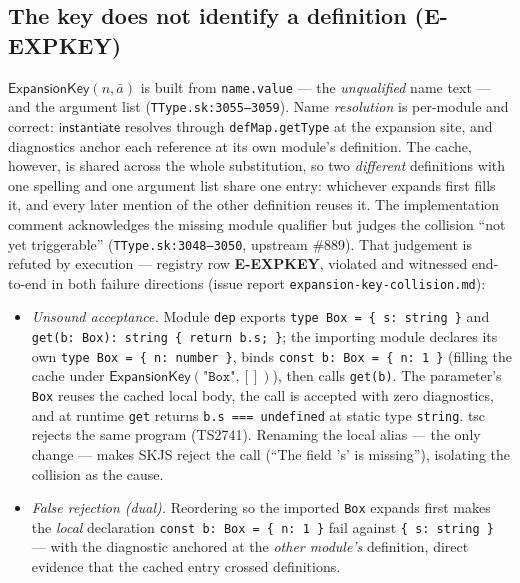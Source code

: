 \documentclass[11pt]{article}
\newcommand{\instop}{\mathsf{instantiate}}
\begin{document}
\subsection{The key does not identify a definition (E-EXPKEY)}
\label{sec:expkey}

$\mathsf{ExpansionKey}(n,\bar{a})$ is built from \texttt{name.value} —
the \emph{unqualified} name text — and the argument list
(\texttt{TType.sk:3055--3059}). Name \emph{resolution} is per-module and
correct: $\instop$ resolves through \texttt{defMap.getType} at the
expansion site, and diagnostics anchor each reference at its own
module's definition. The cache, however, is shared across the whole
substitution, so two \emph{different} definitions with one spelling and
one argument list share one entry: whichever expands first fills it,
and every later mention of the other definition reuses it. The
implementation comment acknowledges the missing module qualifier but
judges the collision ``not yet triggerable'' (\texttt{TType.sk:3048--3050},
upstream \#889). That judgement is refuted by execution — registry row
\textbf{E-EXPKEY}, violated and witnessed end-to-end in both failure
directions (issue report \texttt{expansion-key-collision.md}):

\begin{itemize}
\item \emph{Unsound acceptance.} Module \texttt{dep} exports
  \texttt{type Box = \{ s: string \}} and
  \texttt{get(b: Box): string \{ return b.s; \}}; the importing module
  declares its own \texttt{type Box = \{ n: number \}}, binds
  \texttt{const b: Box = \{ n: 1 \}} (filling the cache under
  $\mathsf{ExpansionKey}(\texttt{"Box"},[])$), then calls
  \texttt{get(b)}. The parameter's \texttt{Box} reuses the cached local
  body, the call is accepted with zero diagnostics, and at runtime
  \texttt{get} returns \texttt{b.s === undefined} at static type
  \texttt{string}. tsc rejects the same program (TS2741). Renaming the
  local alias — the only change — makes SKJS reject the call
  (``The field 's' is missing''), isolating the collision as the cause.
\item \emph{False rejection (dual).} Reordering so the imported
  \texttt{Box} expands first makes the \emph{local} declaration
  \texttt{const b: Box = \{ n: 1 \}} fail against
  \texttt{\{ s: string \}} — with the diagnostic anchored at the
  \emph{other module's} definition, direct evidence that the cached
  entry crossed definitions.
\end{itemize}
\end{document}
